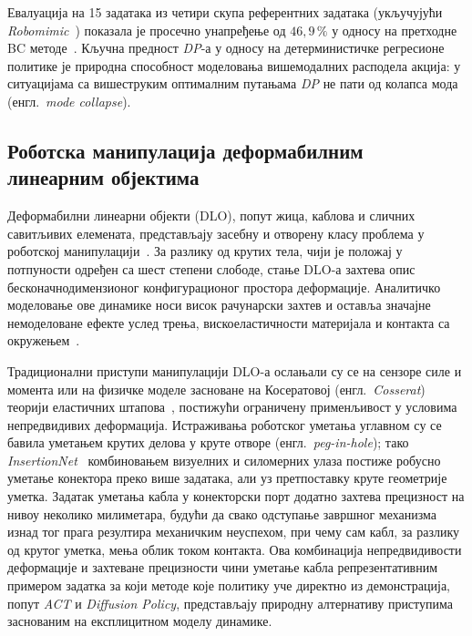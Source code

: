 \documentclass[12pt, a4paper]{article}
\begin{document}
Евалуација на 15 задатака из четири скупа референтних задатака (укључујући \textit{Robomimic}~\cite{mandlekar2021robomimic}) показала је просечно унапређење од $46{,}9\,\%$ у односу на претходне BC методе~\cite{chi2023diffusionpolicy}.
Кључна предност \textit{DP}-а у односу на детерминистичке регресионе политике је природна способност моделовања вишемодалних расподела акција: у ситуацијама са вишеструким оптималним путањама \textit{DP} не пати од колапса мода (енгл.\ \textit{mode collapse}).

\subsection{Роботска манипулација деформабилним линеарним објектима}
\label{subsec:dlo}

Деформабилни линеарни објекти (DLO), попут жица, каблова и сличних савитљивих елемената, представљају засебну и отворену класу проблема у роботској манипулацији~\cite{sanchez2018dlo}.
За разлику од крутих тела, чији је положај у потпуности одређен са шест степени слободе, стање DLO-а захтева опис бесконачнодимензионог конфигурационог простора деформације.
Аналитичко моделовање ове динамике носи висок рачунарски захтев и оставља значајне немоделоване ефекте услед трења, вискоеластичности материјала и контакта са окружењем~\cite{sanchez2018dlo}.

Традиционални приступи манипулацији DLO-а ослањали су се на сензоре силе и момента или на физичке моделе засноване на Косератовој (енгл.\ \textit{Cosserat}) теорији еластичних штапова~\cite{spillmann2007corde}, постижући ограничену применљивост у условима непредвидивих деформација.
Истраживања роботског уметања углавном су се бавила уметањем крутих делова у круте отворе (енгл.\ \textit{peg-in-hole}); тако \textit{InsertionNet}~\cite{spector2021insertionnet} комбиновањем визуелних и силомерних улаза постиже робусно уметање конектора преко више задатака, али уз претпоставку круте геометрије уметка.
Задатак уметања кабла у конекторски порт додатно захтева прецизност на нивоу неколико милиметара, будући да свако одступање завршног механизма изнад тог прага резултира механичким неуспехом, при чему сам кабл, за разлику од крутог уметка, мења облик током контакта.
Ова комбинација непредвидивости деформације и захтеване прецизности чини уметање кабла репрезентативним примером задатка за који методе које политику уче директно из демонстрација, попут \textit{ACT} и \textit{Diffusion Policy}, представљају природну алтернативу приступима заснованим на експлицитном моделу динамике.
\end{document}
